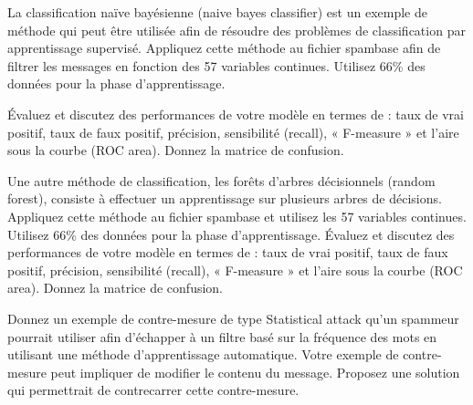 \begin{homeworkProblem}
\begin{homeworkSection}{3.1}
{			}
			
		\end{homeworkSection}
		
		\begin{homeworkSection}{3.2}

			La classification naïve bayésienne (naive bayes classifier) est un exemple de
			méthode qui peut être utilisée afin de résoudre des problèmes de classification par
			apprentissage supervisé. Appliquez cette méthode au fichier spambase afin de filtrer les
			messages en fonction des 57 variables continues. Utilisez 66\% des données pour la phase
			d’apprentissage.
			
			Évaluez et discutez des performances de votre modèle en termes de : taux de vrai positif,
			taux de faux positif, précision, sensibilité (recall), « F-measure » et l’aire sous la courbe
			(ROC area). Donnez la matrice de confusion.
	
			\problemAnswer{
			
			}
			
		\end{homeworkSection}
			
		\begin{homeworkSection}{3.3}

			Une autre méthode de classification, les forêts d’arbres décisionnels (random forest), consiste à
			effectuer un apprentissage sur plusieurs arbres de décisions. Appliquez
			cette méthode au fichier spambase et utilisez les 57 variables continues. Utilisez 66\% des
			données pour la phase d’apprentissage.
			Évaluez et discutez des performances de votre modèle en termes de : taux de vrai positif,
			taux de faux positif, précision, sensibilité (recall), « F-measure » et l’aire sous la courbe
			(ROC area). Donnez la matrice de confusion.

			\problemAnswer{
			
			}
					
		\end{homeworkSection}
		
		\begin{homeworkSection}{3.4}

			Donnez un exemple de contre-mesure de type Statistical attack qu’un spammeur
			pourrait utiliser afin d’échapper à un filtre basé sur la fréquence des mots en utilisant une
			méthode d’apprentissage automatique. Votre exemple de contre-mesure peut impliquer de
			modifier le contenu du message. Proposez une solution qui permettrait de contrecarrer
			cette contre-mesure.

			\problemAnswer{
			
			}
					
		\end{homeworkSection}
		
			
	\end{homeworkProblem}